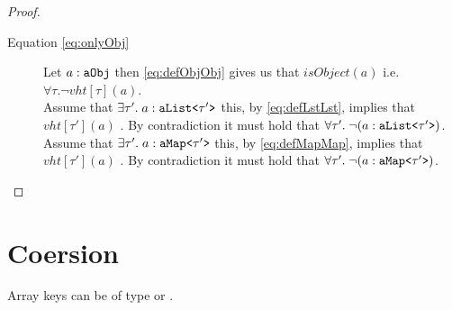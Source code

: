 \begin{proof}
\begin{description}
\item[Equation \ref{eq:onlyObj}]
\begin{subproof}
Let $a : \paobj$ then \ref{eq:defObjObj} gives us that $isObject(a)$ i.e. $\forall \tau. \neg vht[\tau](a)$. \\
Assume that $\exists \tau'.\;a : \palst[\tau']$ this, by \ref{eq:defLstLst}, implies that $vht[\tau'](a)$ \lightning. By contradiction it must hold that $\forall \tau'.\; \neg(a : \palst[\tau'])$.\\
Assume that $\exists \tau'.\;a : \pamap[\tau']$ this, by \ref{eq:defMapMap}, implies that $vht[\tau'](a)$ \lightning. By contradiction it must hold that $\forall \tau'.\; \neg(a : \pamap[\tau'])$.\\
\end{subproof}

\end{description}
\end{proof}


\section{Coersion}

Array keys can be of type \pstring{} or \pint. 












